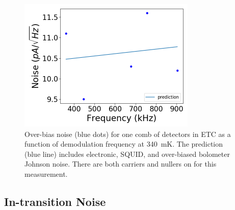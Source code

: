\begin{figure}[ht!]
\begin{center}
\includegraphics[height=2.5in]{figures/overbias_noise.png}
\caption{Over-bias noise (blue dots) for one comb of detectors in \ac{ETC} as a function of demodulation frequency at 340~mK. The prediction (blue line) includes electronic, \ac{SQUID}, and over-biased bolometer Johnson noise. There are both carriers and nullers on for this measurement.
\label{fig:overbias_noise} }
\end{center}
\end{figure}

\subsection{In-transition Noise}
\label{sec:in_transition_noise}

